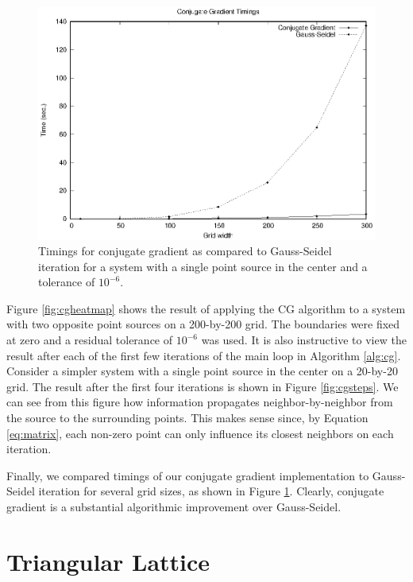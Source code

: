 \documentclass[paper=a4, fontsize=11pt]{scrartcl} %
\numberwithin{equation}{section} %
\numberwithin{figure}{section} %
\numberwithin{table}{section} %
\begin{document}
\begin{figure}
\centering
\includegraphics[width=120mm]{cg_timings.eps}
\caption{Timings for conjugate gradient as compared to Gauss-Seidel iteration for a system with a single point source in the center and a tolerance of $10^{-6}$.}
\label{fig:cgtimings}
\end{figure}

Figure \ref{fig:cgheatmap} shows the result of applying the CG algorithm to a system with two opposite point sources on a 200-by-200 grid. The boundaries were fixed at zero and a residual tolerance of $10^{-6}$ was used. It is also instructive to view the result after each of the first few iterations of the main loop in Algorithm \ref{alg:cg}. Consider a simpler system with a single point source in the center on a 20-by-20 grid. The result after the first four iterations is shown in Figure \ref{fig:cgsteps}. We can see from this figure how information propagates neighbor-by-neighbor from the source to the surrounding points. This makes sense since, by Equation \ref{eq:matrix}, each non-zero point can only influence its closest neighbors on each iteration.
\linebreak

Finally, we compared timings of our conjugate gradient implementation to Gauss-Seidel iteration for several grid sizes, as shown in Figure \ref{fig:cgtimings}. Clearly, conjugate gradient is a substantial algorithmic improvement over Gauss-Seidel.


\section{Triangular Lattice}
\end{document}
